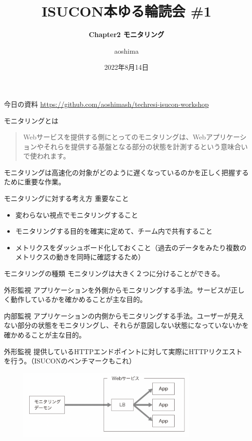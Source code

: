 \documentclass{beamer}
\title{\bfseries ISUCON本ゆる輪読会 \#1}
\subtitle{\bfseries Chapter2 モニタリング}
\author{aoshima}
\date{2022年8月14日}
\begin{document}
\begin{frame}
  \titlepage
\end{frame}

\begin{frame}{今日の資料}
  \href{https://github.com/aoshimash/techresi-isucon-workshop}{https://github.com/aoshimash/techresi-isucon-workshop}
\end{frame}

\begin{frame}{モニタリングとは}
  \begin{quote}
    Webサービスを提供する側にとってのモニタリングは、Webアプリケーションやそれらを提供する基盤となる部分の状態を計測するという意味合いで使われます。
  \end{quote}
  モニタリングは高速化の対象がどのように遅くなっているのかを正しく把握するために重要な作業。
\end{frame}

\begin{frame}{モニタリングに対する考え方}
  重要なこと
  \begin{itemize}
    \item 変わらない視点でモニタリングすること
    \item モニタリングする目的を確実に定めて、チーム内で共有すること
    \item メトリクスをダッシュボード化しておくこと（過去のデータをみたり複数のメトリクスの動きを同時に確認するため）
  \end{itemize}
\end{frame}

\begin{frame}{モニタリングの種類}
  モニタリングは大きく２つに分けることができる。
  \begin{block}{外形監視}
    アプリケーションを外側からモニタリングする手法。サービスが正しく動作しているかを確かめることが主な目的。
  \end{block}
  \begin{block}{内部監視}
    アプリケーションの内側からモニタリングする手法。ユーザーが見えない部分の状態をモニタリングし、それらが意図しない状態になっていないかを確かめることが主な目的。
  \end{block}
\end{frame}

\begin{frame}{外形監視}
  提供しているHTTPエンドポイントに対して実際にHTTPリクエストを行う。（ISUCONのベンチマークもこれ）
  \begin{figure}
    \centering
    \includegraphics[clip, keepaspectratio, width=90mm]{./fig/external_monitoring.png}
  \end{figure}
\end{frame}
\end{document}
